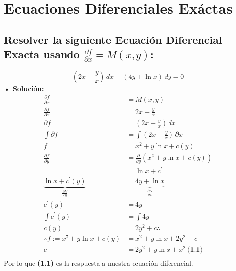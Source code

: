 \documentclass[letterpaper, 12pt]{article}
\begin{document}
\thispagestyle{fancy}
\section*{Ecuaciones Diferenciales Exáctas}
\subsection*{Resolver la siguiente Ecuación Diferencial Exacta usando \(\frac{\partial f}{\partial x}=M(x,y)\):}
\justify
\[\left(2x+\frac{y}{x}\right)\, dx+\left(4y+\ln x\right)\, dy=0\]
{\large \textbf{ • Solución:}
\begin{equation*}
    \begin{aligned}
        \frac{\partial f}{\partial x}&=M(x,y)\\[5pt]
        \frac{\partial f}{\partial x}&=2x+\frac{y}{x}\\[5pt]
        \partial f&=\left(2x+\frac{y}{x}\right)\, dx\\[5pt]
        \int \partial f&=\int \left(2x+\frac{y}{x}\right)\, \partial x\\[5pt]
        f&=x^2+y\ln x+c(y)\\[5pt]
        \frac{\partial f}{\partial y}&=\frac{\partial}{\partial y} \left(x^2+y\ln x+c(y)\right)\\[5pt]
        &=\ln x+c^{\prime}\\[5pt]
        \underbrace{\ln x+c^{\prime}(y)}_{\frac{\partial M}{\partial y}}&=\underbrace{4y+\ln x}_{\frac{\partial N}{\partial x}}\\[5pt]
        c^{\prime}(y)&=4y\\[5pt]
        \int c^{\prime}(y)&=\int 4y\\[5pt]
        c(y)&=2y^2+c\therefore\\[5pt]
        \therefore f:= x^2+y\ln x+c(y)&=x^2+y\ln x+2y^2+c\\[5pt]
        c&=2y^2+y\ln x+x^2\: \textbf{(1.1)}\\[10pt]
    \end{aligned}
\end{equation*}
Por lo que \textbf{(1.1)} es la respuesta a nuestra ecuación diferencial.}
\end{document}
